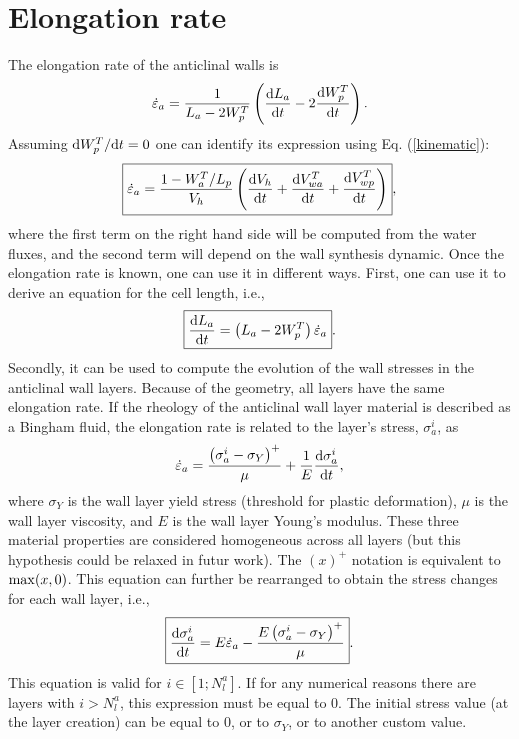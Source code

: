 \documentclass[]{article}
\begin{document}
\section{Elongation rate}
The elongation rate of the anticlinal walls is
\begin{equation}
	\dot{\varepsilon}_a=\frac{1}{L_a-2W_p^T}\left(\frac{{\rm d} L_a}{{\rm d} t}-2\frac{{\rm d} W_p^T}{{\rm d} t}\right).
\end{equation}
Assuming ${\rm d} W_p^T/{\rm d} t=0$ one can identify its expression using Eq. (\ref{kinematic}):
\begin{equation}
	\boxed{
	\dot{\varepsilon}_a = \frac{1-W_a^T/L_p}{V_h}\left(\frac{{\rm d} V_h}{{\rm d} t} + \frac{{\rm d} V_{wa}^T}{{\rm d} t} +\frac{{\rm d} V_{wp}^T}{{\rm d} t} \right)},
\end{equation}
where the first term on the right hand side will be computed from the water fluxes, and the second term will depend on the wall synthesis dynamic.
Once the elongation rate is known, one can use it in different ways. First, one can use it to derive an equation for the cell length, i.e.,
\begin{equation}
	\boxed{
	\frac{{\rm d} L_a}{{\rm d} t}=\left(L_a-2W_p^T\right )\dot{\varepsilon}_a}.
\end{equation}
Secondly, it can be used to compute the evolution of the wall stresses in the anticlinal wall layers. Because of the geometry, all layers have the same elongation rate. If the rheology of the anticlinal wall layer material is described as a Bingham fluid, the elongation rate is related to the layer's stress, $\sigma_a^i$, as
\begin{equation}
	\dot{\varepsilon}_a=\frac{\left(\sigma_a^i-\sigma_Y\right)^+}{\mu}+\frac{1}{E}\frac{{\rm d} \sigma_a^i}{{\rm d} t},
\end{equation}
where $\sigma_Y$ is the wall layer yield stress (threshold for plastic deformation), $\mu$ is the wall layer viscosity, and $E$ is the wall layer Young's modulus. These three material properties are considered homogeneous across all layers (but this hypothesis could be relaxed in futur work). The $(x)^+$ notation is equivalent to ${\rm max} (x,0)$.
This equation can further be rearranged to obtain the stress changes for each wall layer, i.e.,
\begin{equation}
	\boxed{
	\frac{{\rm d} \sigma_a^i}{{\rm d} t}= E \dot{\varepsilon}_a- \frac{E\left(\sigma_a^i-\sigma_Y\right)^+}{\mu}}.
\end{equation}
This equation is valid for $i \in [1;N_l^a]$. If for any numerical reasons there are layers with $i>N_l^a$, this expression must be equal to 0. The initial stress value (at the layer creation) can be equal to 0, or to $\sigma_Y$, or to another custom value.
\end{document}
